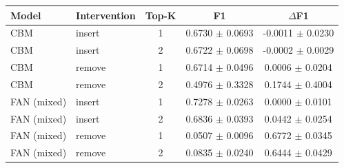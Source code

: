 \begin{tabular}{llccc}
\toprule
Model & Intervention & Top-K & F1 & $\Delta$F1 \\
\midrule
CBM & insert & 1 & 0.6730 $\pm$ 0.0693 & -0.0011 $\pm$ 0.0230 \\
CBM & insert & 2 & 0.6722 $\pm$ 0.0698 & -0.0002 $\pm$ 0.0029 \\
CBM & remove & 1 & 0.6714 $\pm$ 0.0496 & 0.0006 $\pm$ 0.0204 \\
CBM & remove & 2 & 0.4976 $\pm$ 0.3328 & 0.1744 $\pm$ 0.4004 \\
FAN (mixed) & insert & 1 & 0.7278 $\pm$ 0.0263 & 0.0000 $\pm$ 0.0101 \\
FAN (mixed) & insert & 2 & 0.6836 $\pm$ 0.0393 & 0.0442 $\pm$ 0.0254 \\
FAN (mixed) & remove & 1 & 0.0507 $\pm$ 0.0096 & 0.6772 $\pm$ 0.0345 \\
FAN (mixed) & remove & 2 & 0.0835 $\pm$ 0.0240 & 0.6444 $\pm$ 0.0429 \\
\bottomrule
\end{tabular}
